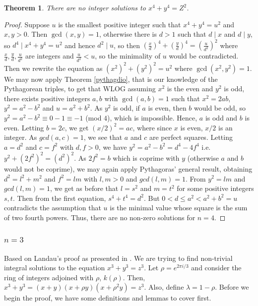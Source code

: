 \documentclass{article}
\newtheorem{thm}{Theorem}[section]
\theoremstyle{definition}
\theoremstyle{definition}
\theoremstyle{definition}
\begin{document}
\begin{thm}
    There are no integer solutions to $x^4+y^4=Z^2$.

\end{thm}
\begin{proof}
    
Suppose $u$ is the smallest positive integer such that $x^4+y^4=u^2$ and $x,y>0$.  Then $\gcd(x,y)=1$, otherwise there is $d>1$ such that $d\mid x$ and $d\mid y$, so $d^4\mid x^4+y^4=u^2$ and hence $d^2\mid u$, so then $\left(\frac{x}{d}\right)^4+\left(\frac{y}{d}\right)^4=\left(\frac{u}{d^2}\right)^2$ where $\frac xd,\frac yd,\frac u{d^2}$ are integers and $\frac u{d^2}<u$, so the minimality of $u$ would be contradicted.
\newline\newline
Then we rewrite the equation as $(x^2)^2+(y^2)^2=u^2$ where $\gcd(x^2,y^2)=1$. We may now apply Theorem \ref{pythagdio}, that is our knowledge of the Pythagorean triples, to get that WLOG assuming $x^2$ is the even and $y^2$ is odd, there exists positive integers $a,b$ with $\gcd(a,b)=1$ such that $x^2=2ab$,  $y^2=a^2-b^2$ and $u=a^2+b^2$.
\newline\newline
As $y^2$ is odd, if $a$ is even, then $b$ would be odd, so $y^2=a^2-b^2\equiv0-1 \equiv -1$ (mod $4$), which is impossible. Hence, $a$ is odd and $b$ is even. Letting $b=2c$, we get $(x/2)^2=ac$, where since $x$ is even,  $x/2$ is an integer. As $gcd(a,c)=1$, we see that $a$ and $c$ are perfect squares. Letting $a=d^2$ and $c=f^2$ with $d,f>0$, we have $y^2=a^2-b^2=d^4-4f^4$ i.e. $y^2+(2f^2)^2=(d^2)^2$. As $2f^2=b$ which is coprime with $y$ (otherwise $a$ and $b$ would not be coprime), we may again apply Pythagoras' general result, obtaining $d^2=l^2+m^2$ and $f^2=lm$ with $l,m>0$ and $gcd(l,m)=1$. 
\newline\newline
From $y^2=lm$ and $gcd(l,m)=1$, we get as before that $l=s^2$ and $m=t^2$ for some positive integers $s,t$. Then from the first equation, $s^4+t^4=d^2$. But $0<d \leq a^2<a^2+b^2=u$ contradicts the assumption that $u$ is the minimal value whose square is the sum of two fourth powers. Thus, there are no non-zero solutions for $n=4$.

\end{proof}

\subsubsection{$n=3$}\label{n3} Based on Landau's proof as presented in \cite{HW}.
We are trying to find non-trivial integral solutions to the equation $x^3+y^3=z^3$. Let $\rho=e^{2\pi i/3}$ and consider the ring of integers adjoined with $\rho$, $k(\rho)$. Then, $x^3+y^3=(x+y)(x+\rho y)(x+\rho^2y)=z^3$. Also, define $\lambda=1-\rho$. Before we begin the proof, we have some definitions and lemmas to cover first.
\end{document}
